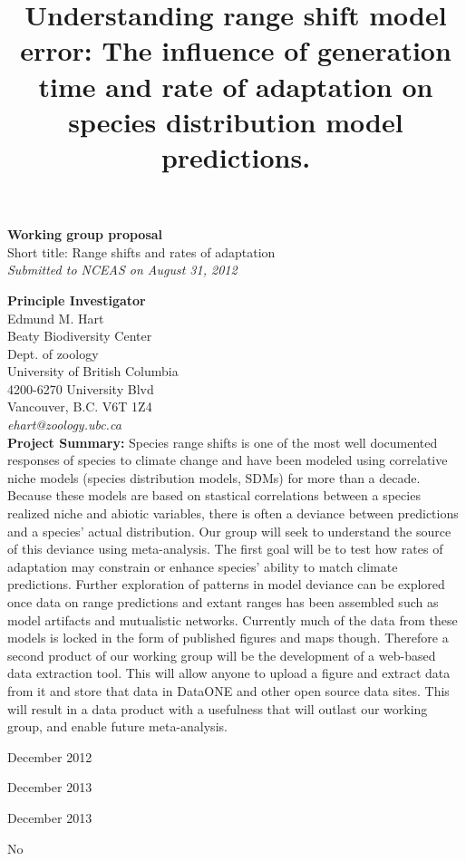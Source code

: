 \documentclass[pdftex,11pt,a4paper]{article}\usepackage{graphicx, color}
\begin{document}
\title{Understanding range shift model error: The influence of generation time and rate of adaptation on species distribution model predictions.}
 \date{}
\maketitle

{\bf  Working group proposal \\}
Short title: Range shifts and rates of adaptation \\
{\it Submitted to NCEAS on August 31, 2012\\}

{\bf Principle Investigator\\}
Edmund M. Hart\\
Beaty Biodiversity Center\\
Dept. of zoology\\
University of British Columbia\\
4200-6270 University Blvd\\
Vancouver, B.C. V6T 1Z4\\
{\it ehart@zoology.ubc.ca}\\ 



{\bf Project Summary:} Species range shifts is one of the most well documented responses of species to climate change and have been modeled  using correlative niche models (species distribution models, SDMs) for more than a decade.  Because these models are based on stastical correlations between a species realized niche and abiotic variables, there is often a deviance between predictions and a species' actual distribution.  Our group will seek to understand the source of this deviance using meta-analysis.  The first goal will be to test how rates of adaptation may constrain or enhance species' ability to match climate predictions. Further exploration of patterns in model deviance can be explored once data on range predictions and extant ranges has been assembled such as model artifacts and mutualistic networks. Currently much of the data from these models is locked in the form of published figures and maps though.  Therefore a second product of our working group will be the development of a web-based data extraction tool. This will allow anyone to upload a figure and extract data from it and store that data in DataONE and other open source data sites.  This will result in a data product with a usefulness that will outlast our working group, and enable future meta-analysis.
\\
\begin{description}\itemsep1pt
\item[Start date] December 2012
\item[End date] December 2013
\item[Data release] December 2013
\item[Resubmission?] No
\end{description}
\end{document}
